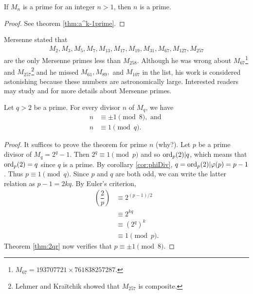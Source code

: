 \documentclass{subfiles}
\begin{document}
		\begin{proposition}
			If $M_n$ is a prime for an integer $n>1$, then $n$ is a prime.
		\end{proposition}
		
		\begin{proof}
			See theorem \eqref{thm:a^k-1prime}.
		\end{proof}
		
	Mersenne stated that 
		\begin{align*}
				M_{2}, M_{3}, M_{5}, M_{7}, M_{13},M_{17},M_{19},M_{31},M_{67},M_{127},M_{257}
		\end{align*}
	are the only Mersenne primes less than $M_{258}$. Although he was wrong about $M_{67}$\footnote{$M_{67}=193707721 \times 761838257287.$} and $M_{257}$\footnote{Lehmer and Kra\"{i}tchik showed that $M_{257}$ is composite.} and he missed $M_{61}, M_{89},$ and $M_{107}$ in the list, his work is considered astonishing because these numbers are astronomically large. Interested readers may study \cite{ch:primes-archibald} and \cite{ch:primes-ribenboim} for more details about Mersenne primes.
	
		\begin{theorem}
				Let $q>2$ be a prime. For every divisor $n$ of $M_q$, we have
					\begin{align*}
						n &\equiv \pm 1 \pmod 8, \text{ and }\\
						n &\equiv 1 \pmod q.
					\end{align*}
		\end{theorem}
		
		\begin{proof}
			It suffices to prove the theorem for prime $n$ (why?). Let $p$ be a prime divisor of $M_q=2^q-1$. Then $2^q \equiv 1 \pmod p$ and so $\operatorname{ord}_p(2)|q$, which means that $\operatorname{ord}_p(2)=q$ since $q$ is a prime. By corollary \eqref{cor:phiDiv}, $q=\operatorname{ord}_p(2)|\varphi(p)=p-1$. Thus $p \equiv 1 \pmod q$. Since $p$ and $q$ are both odd, we can write the latter relation as $p-1=2kq$. By Euler's criterion,
				\begin{align*}
					\left(\dfrac{2}{p}\right) &\equiv 2^{(p-1)/2} \\
											  &\equiv 2^{kq}\\
											  &\equiv \left(2^q\right)^k\\
											  &\equiv 1 \pmod p.
				\end{align*}
			Theorem \eqref{thm:2qr} now verifies that $p \equiv \pm 1 \pmod 8$.
		\end{proof}
		
\end{document}
